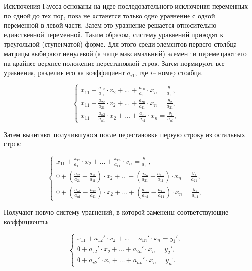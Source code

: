 Исключения Гаусса основаны на идее последовательного исключения переменных по одной до тех пор, пока не останется только одно уравнение с одной переменной в левой части. Затем это уравнение решается относительно единственной переменной. Таким образом, систему уравнений приводят к треугольной (ступенчатой) форме. Для этого среди элементов первого столбца матрицы выбирают ненулевой (а чаще максимальный) элемент и перемещают его на крайнее верхнее положение перестановкой строк. Затем нормируют все уравнения, разделив его на коэффициент $a_{i1}$, где $i$– номер столбца.

\begin{equation}
    \begin{cases}
        x_{11} + \frac{a_{12}}{a_{11}} \cdot x_2 + \dots + \frac{a_{1n}}{a_{11}} \cdot x_n = \frac{y_1}{a_{11}},
        \\
        x_{11} + \frac{a_{22}}{a_{21}} \cdot x_2 + \dots + \frac{a_{2n}}{a_{21}} \cdot x_n = \frac{y_2}{a_{21}},
        \\[0.5em]
        x_{11} + \frac{a_{n2}}{a_{n1}} \cdot x_2 + \dots + \frac{a_{nn}}{a_{n1}} \cdot x_n = \frac{y_1}{a_{n1}},
     \end{cases}
\end{equation}

Затем вычитают получившуюся после перестановки первую строку из остальных строк:

\begin{equation}
    \begin{cases}
        x_{11} + \frac{a_{12}}{a_{11}} \cdot x_2 + \dots + \frac{a_{1n}}{a_{11}} \cdot x_n = \frac{y_1}{a_{11}},
        \\[0.3em]
        0 + \left(\frac{a_{22}}{a_{21}} - \frac{a_{12}}{a_{11}} \right) \cdot x_2 + \dots + \left(\frac{a_{2n}}{a_{21}} - \frac{a_{1n}}{a_{11}}  \right) \cdot x_n = \frac{y_2}{a_{21}},
        \\[0.7em]
        0 + \left(\frac{a_{n2}}{a_{n1}} - \frac{a_{12}}{a_{11}} \right) \cdot x_2 + \dots + \left( \frac{a_{nn}}{a_{n1}} - \frac{a_{1n}}{a_{11}}  \right) \cdot x_n = \frac{y_1}{a_{n1}},
     \end{cases}
\end{equation}

Получают новую систему уравнений, в которой заменены соответствующие коэффициенты:

\begin{equation}
    \begin{cases}
        x_{11} + a_{12}'\cdot x_2 + \dots + a_{1n}' \cdot x_n = y_1',
        \\
        0 + a_{22}' \cdot x_2 + \dots + a_{2n}' \cdot x_n = y_2',
        \\[0.5em]
        0  + a_{n2}' \cdot x_2 + \dots + a_{nn}' \cdot x_n = y_n'.
     \end{cases}
\end{equation}

